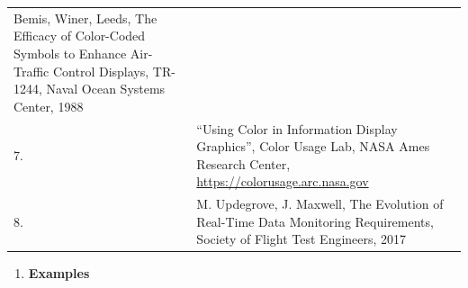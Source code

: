 \documentclass[
]{book}
\providecommand{\tightlist}{%
  \setlength{\itemsep}{0pt}\setlength{\parskip}{0pt}}
\begin{document}
\begin{longtable}[]{@{}ll@{}}
\begin{minipage}[t]{0.93\columnwidth}
Bemis, Winer, Leeds, The Efficacy of Color-Coded Symbols to Enhance Air-Traffic Control Displays, TR-1244, Naval Ocean Systems Center, 1988\strut
\end{minipage}\tabularnewline
\begin{minipage}[t]{0.01\columnwidth}\raggedright
7.\strut
\end{minipage} & \begin{minipage}[t]{0.93\columnwidth}\raggedright
``Using Color in Information Display Graphics'', Color Usage Lab, NASA Ames Research Center, \url{https://colorusage.arc.nasa.gov}\strut
\end{minipage}\tabularnewline
\begin{minipage}[t]{0.01\columnwidth}\raggedright
8.\strut
\end{minipage} & \begin{minipage}[t]{0.93\columnwidth}\raggedright
M. Updegrove, J. Maxwell, The Evolution of Real-Time Data Monitoring Requirements, Society of Flight Test Engineers, 2017\strut
\end{minipage}\tabularnewline
\bottomrule
\end{longtable}

\begin{enumerate}
\def\labelenumi{\arabic{enumi}.}
\setcounter{enumi}{6}
\tightlist
\item
  \textbf{Examples}
\end{enumerate}
\end{document}
